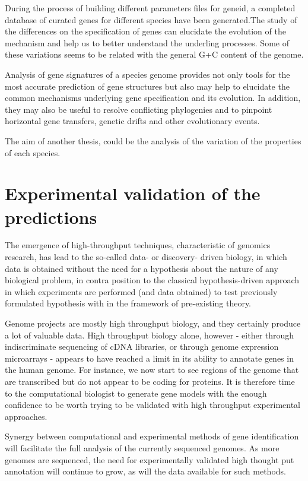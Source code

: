 During the process of building different parameters files for geneid,
a completed database of curated genes for different species have been
generated.The study of the differences on the specification of genes
can elucidate the evolution of the mechanism and help us to better
understand the underling processes. Some of these variations seems to
be related with the general G+C content of the genome.
 
Analysis of gene signatures of a species genome provides not only
tools for the most accurate prediction of gene structures but also may
help to elucidate the common mechanisms underlying gene specification
and its evolution. In addition, they may also be useful to resolve
conflicting phylogenies and to pinpoint horizontal gene transfers,
genetic drifts and other evolutionary events.

The aim of another thesis, could be the analysis of the variation of
the properties of each species.

\section{Experimental validation of the predictions}

The emergence of high-throughput techniques, characteristic of
genomics research, has lead to the so-called data- or discovery- driven
biology, in which data is obtained without the need for a hypothesis
about the nature of any biological problem, in contra position to the
classical hypothesis-driven approach in which experiments are
performed (and data obtained) to test previously formulated hypothesis
with in the framework of pre-existing theory.

Genome projects are mostly high throughput biology, and they certainly
produce a lot of valuable data. High throughput biology alone, however
- either through indiscriminate sequencing of cDNA libraries, or
through genome expression microarrays - appears to have reached a
limit in its ability to annotate genes in the human genome. For
instance, we now start to see regions of the genome that are
transcribed but do not appear to be coding for proteins. It is
therefore time to the computational biologist to generate gene models
with the enough confidence to be worth trying to be validated with
high throughput experimental approaches.

Synergy between computational and experimental methods of gene
identification will facilitate the full analysis of the currently
sequenced genomes. As more genomes are sequenced, the need
for experimentally validated high thought put annotation will continue
to grow, as will the data available for such methods.

